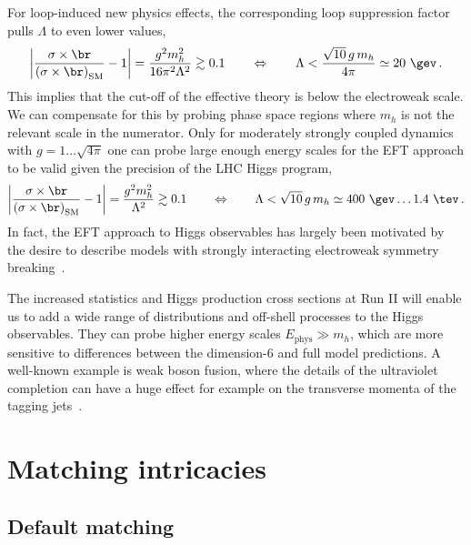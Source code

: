 For loop-induced new physics effects, the corresponding loop
suppression factor pulls $\Lambda$ to even lower values,
%
\begin{align} \left| \frac{\sigma \times \br}{\left( \sigma \times \br
\right)_\text{SM}} -1 \right | = \frac{g^2 m_h^2}{16\pi^2 \Lambda^2}
\gtrsim 0.1 \qquad \Leftrightarrow \qquad \Lambda < \frac{\sqrt{10} \,
g\, m_h}{4\pi} \simeq 20~\gev \,.
\label{eq:lmax_loop}
\end{align}
%
This implies that the cut-off of the effective theory is below the
electroweak scale. We can compensate for this by probing phase space
regions where $m_h$ is not the relevant scale in the numerator.  Only
for moderately strongly coupled dynamics with $g = 1\dots\sqrt{4\pi}$
one can probe large enough energy scales for the EFT approach to be
valid given the precision of the LHC Higgs program,
%
\begin{align} \left| \frac{\sigma \times \br}{\left( \sigma \times \br
\right)_\text{SM}} -1 \right| = \frac{g^2 m_h^2}{\Lambda^2} \gtrsim
0.1 \qquad \Leftrightarrow \qquad \Lambda < \sqrt{10} \, g\,m_h \simeq
400~\gev\dots1.4~\tev \, .
\label{eq:lmax_strong}
\end{align}
%
In fact, the EFT approach to Higgs observables has largely been
motivated by the desire to describe models with strongly interacting
electroweak symmetry breaking~\cite{silh}.

The increased statistics and Higgs production cross sections at Run II
will enable us to add a wide range of distributions and off-shell
processes to the Higgs observables. They can probe higher energy
scales $E_{\text{phys}} \gg m_h$, which are more sensitive to
differences between the dimension-6 and full model predictions.  A
well-known example is weak boson fusion, where the details of the
ultraviolet completion can have a huge effect for example on the
transverse momenta of the tagging
jets~\cite{bad_one,spins,phi_jj,higgs_pole}.






\section{Matching intricacies}

\subsection{Default matching}

